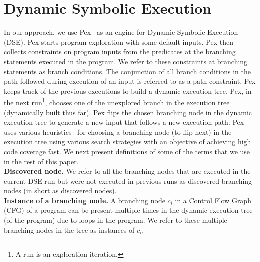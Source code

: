\section{Dynamic Symbolic Execution}
In our approach, we use Pex~\cite{Pex} as an engine for Dynamic Symbolic Execution (DSE). Pex starts program exploration with some default inputs. Pex then collects constraints on program inputs from the predicates at the branching statements executed in the program. We refer to these constraints at branching statements as branch conditions. 
The conjunction of all branch conditions in the path followed during execution of an input is referred to as a path constraint. Pex keeps track of the previous executions to build a dynamic execution tree. Pex, in the next run\footnote{A run is an exploration iteration.}, chooses one of the unexplored branch in the execution tree (dynamically built thus far). Pex flips the chosen branching node in the dynamic execution tree to generate a new input that follows a new execution path. 
Pex uses various heuristics~\cite{fitnex} for choosing a branching node (to flip next) in the execution tree using various search strategies with an objective of achieving high code coverage fast. We next present definitions of some of the terms that we use in the rest of this paper.
\\ \textbf{Discovered node. }We refer to all the branching nodes that are executed in the current DSE run but were not executed in previous runs as discovered branching nodes (in short as discovered nodes).
\\ \textbf{Instance of a branching node. }A branching node $c_i$ in a Control Flow Graph (CFG) of a program can be present multiple times in the dynamic execution tree (of the program) due to loops in the program. We refer to these multiple branching nodes in the tree as instances of $c_i$.
 
